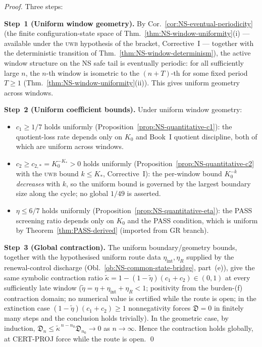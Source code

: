 \documentclass[12pt,oneside]{amsbook}
\theoremstyle{plain}
\theoremstyle{definition}
\theoremstyle{remark}
\begin{document}
\begin{proof}
Three steps:

\textbf{Step~1 (Uniform window geometry).}
By Cor.~\ref{cor:NS-eventual-periodicity} (the finite
configuration-state space of
Thm.~\ref{thm:NS-window-uniformity}(i) --- available under the
\textsc{uwb} hypothesis of the bracket, Corrective~I --- together
with the deterministic transition of
Thm.~\ref{thm:NS-window-determinism}), the active window structure
on the NS safe tail is eventually periodic: for all sufficiently
large $n$, the $n$-th window is isometric to the $(n+T)$-th for
some fixed period $T \geq 1$
(Thm.~\ref{thm:NS-window-uniformity}(ii)). This gives uniform
geometry across windows.

\textbf{Step~2 (Uniform coefficient bounds).}
Under uniform window geometry:
\begin{itemize}
 \item $c_1 \geq 1/7$ holds uniformly
 (Proposition~\ref{prop:NS-quantitative-c1}): the quotient-loss
 rate depends only on $K_0$ and Book~I quotient discipline,
 both of which are uniform across windows.
 \item $c_2 \geq c_{2,*} = K_0^{-K_*} > 0$ holds uniformly
 (Proposition~\ref{prop:NS-quantitative-c2} with the
 \textsc{uwb} bound $k \leq K_*$, Corrective~I): the per-window
 bound $K_0^{-k}$ \emph{decreases} with $k$, so the uniform
 bound is governed by the largest boundary size along the cycle;
 no global $1/49$ is asserted.
 \item $\eta \leq 6/7$ holds uniformly
 (Proposition~\ref{prop:NS-quantitative-eta}): the PASS
 screening ratio depends only on $K_0$ and the PASS
 condition, which is uniform by
 Theorem~\ref{thm:PASS-derived} (imported from GR branch).
\end{itemize}

\textbf{Step~3 (Global contraction).}
The uniform boundary/geometry bounds, together with the
hypothesised uniform route data $\eta_{\mathrm{int}}, \eta_R$
supplied by the renewal-control discharge
(Obl.~\ref{ob:NS-common-state-bridge}, part~(e)),
give the same symbolic contraction ratio
$\widetilde\kappa = 1 - (1-\widetilde\eta)(c_1+c_2)
\in (0,1)$ at every sufficiently late window
($\widetilde\eta = \eta + \eta_{\mathrm{int}} + \eta_R < 1$;
positivity from the burden-(f) contraction domain; no numerical
value is certified while the route is open; in the extinction case
$(1-\widetilde\eta)(c_1+c_2) \geq 1$ nonnegativity forces
$\mathfrak{D} = 0$ in finitely many steps and the conclusion holds
trivially). In the geometric case, by induction,
$\mathfrak{D}_n \leq
\widetilde\kappa^{\,n-n_0}\mathfrak{D}_{n_0} \to 0$ as
$n \to \infty$. Hence the contraction holds globally, at
CERT-PROJ force while the route is open. \qed
\end{proof}
\end{document}
